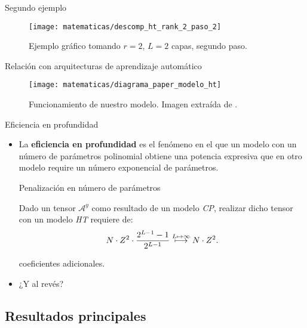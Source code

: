 \begin{frame}{Segundo ejemplo}

	\begin{figure}
		\texttt{[image: matematicas/descomp\_ht\_rank\_2\_paso\_2]}
		\caption{Ejemplo gráfico tomando $r = 2$, $L = 2$ capas, segundo paso.}
	\end{figure}

\end{frame}

\begin{frame}{Relación con arquitecturas de aprendizaje automático}

	\begin{figure}
		\centering
		\texttt{[image: matematicas/diagrama\_paper\_modelo\_ht]}
		\caption{Funcionamiento de nuestro modelo. Imagen extraída de \cite{matematicas:principal}.}
	\end{figure}


\end{frame}

\begin{frame}{Eficiencia en profundidad}
	\begin{itemize}
		\item La \textbf{eficiencia en profundidad} es el fenómeno en el que un modelo con un número de parámetros polinomial obtiene una potencia expresiva que en otro modelo require un número exponencial de parámetros.
		      \begin{block}{Penalización en número de parámetros}

			      Dado un tensor $\mathcal{A}^y$ como resultado de un modelo \textit{CP}, realizar dicho tensor con un modelo \textit{HT} requiere de:
			      \begin{equation}
				      N \cdot Z^2 \cdot \frac{2^{L-1} - 1}{2^{L-1}} \stackrel{L \mapsto \infty}{\longmapsto} N \cdot Z^2.
			      \end{equation}

			      coeficientes adicionales.
		      \end{block}

		\item ¿Y al revés?
	\end{itemize}
\end{frame}

\subsection{Resultados principales}

